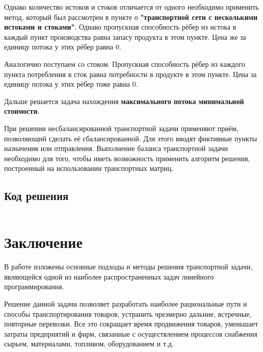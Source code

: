 \documentclass[a4paper,12pt]{article}
\begin{document}
Однако количество истоков и стоков отличается от одного необходимо применить метод, который был рассмотрен в пункте о \textbf{"транспортной сети с несколькими истоками и стоками"}. Однако пропускная способность рёбер из истока в каждый пункт производства равна запасу продукта в этом пункте. Цена же за единицу потока у этих рёбер равна 0.

Аналогично поступаем со стоком. Пропускная способность рёбер из каждого пункта потребления в сток равна потребности в продукте в этом пункте. Цена за единицу потока у этих рёбер тоже равна 0.

Дальше решается задача нахождения \textbf{максимального потока минимальной стоимости}.

При решении несбалансированной транспортной задачи применяют приём, позволяющий сделать её сбалансированной. Для этого вводят фиктивные пункты назначения или отправления. Выполнение баланса транспортной задачи необходимо для того, чтобы иметь возможность применить алгоритм решения, построенный на использовании транспортных матриц.

\subsection{Код решения}
\begin{lstlisting}

\end{lstlisting}

\clearpage
	
\section{Заключение}
	В работе изложены основные подходы и методы решения транспортной задачи, являющейся одной из наиболее распространенных задач линейного программирования. 
	
	Решение данной задачи позволяет разработать наиболее рациональные пути и способы транспортирования товаров, устранить чрезмерно дальние, встречные, повторные перевозки. Все это сокращает время продвижения товаров, уменьшает затраты предприятий и фирм, связанные с осуществлением процессов снабжения сырьем, материалами, топливом, оборудованием и т.д.
	
\end{document}
